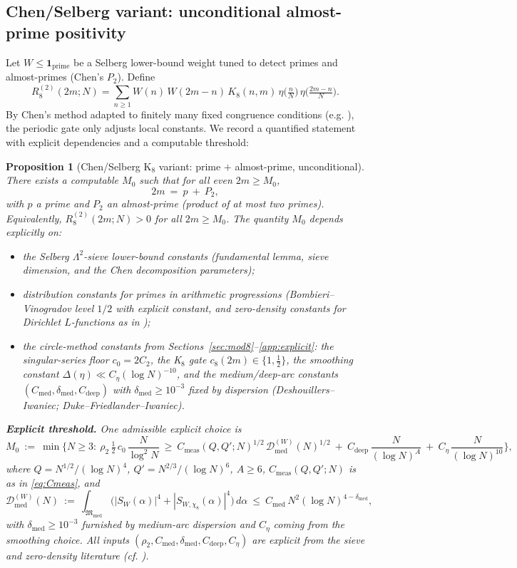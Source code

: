 \documentclass[11pt]{article}
\newtheorem{proposition}[theorem]{Proposition}
\theoremstyle{definition}
\theoremstyle{remark}
\begin{document}
\subsection*{Chen/Selberg variant: unconditional almost-prime positivity}
Let $W\le \mathbf 1_{\mathrm{prime}}$ be a Selberg lower-bound weight tuned to detect primes and almost-primes (Chen’s $P_2$). Define
\[
R_8^{(2)}(2m;N)=\sum_{n\ge 1} W(n)\,W(2m{-}n)\,K_8(n,m)\,\eta\!\Big(\tfrac{n}{N}\Big)\,\eta\!\Big(\tfrac{2m-n}{N}\Big).
\]
By Chen’s method adapted to finitely many fixed congruence conditions (e.g. \cite{Chen1973,Vaughan1997}), the periodic gate only adjusts local constants. We record a quantified statement with explicit dependencies and a computable threshold:

\begin{proposition}[Chen/Selberg K$_8$ variant: prime $+$ almost-prime, unconditional]
There exists a computable $M_0$ such that for all even $2m\ge M_0$,
\[
2m\ =\ p\ +\ P_2,
\]
with $p$ a prime and $P_2$ an almost-prime (product of at most two primes). Equivalently, $R_8^{(2)}(2m;N)>0$ for all $2m\ge M_0$. The quantity $M_0$ depends explicitly on:
\begin{itemize}
  \item the Selberg $\Lambda^2$-sieve lower-bound constants (fundamental lemma, sieve dimension, and the Chen decomposition parameters);
  \item distribution constants for primes in arithmetic progressions (Bombieri–Vinogradov level $1/2$ with explicit constant, and zero-density constants for Dirichlet $L$-functions as in \cite[Ch.~13]{MontgomeryVaughan2007});
  \item the circle-method constants from Sections~\ref{sec:mod8}–\ref{app:explicit}: the singular-series floor $c_0=2C_2$, the K$_8$ gate $c_8(2m)\in\{1,\tfrac12\}$, the smoothing constant $\Delta(\eta)\ll C_{\eta}(\log N)^{-10}$, and the medium/deep-arc constants $(C_{\mathrm{med}},\delta_{\mathrm{med}},C_{\mathrm{deep}})$ with $\delta_{\mathrm{med}}\ge 10^{-3}$ fixed by dispersion (Deshouillers–Iwaniec; Duke–Friedlander–Iwaniec).
\end{itemize}

\medskip
\noindent\textbf{Explicit threshold.} One admissible explicit choice is
\[
M_0\ :=\ \min\Big\{N\ge 3:\ \rho_2\,\tfrac12\,c_0\,\frac{N}{\log^2 N}\ \ge\ C_{\mathrm{meas}}(Q,Q';N)^{1/2}\,\mathcal D_{\mathrm{med}}^{(W)}(N)^{1/2}\ +\ C_{\mathrm{deep}}\,\frac{N}{(\log N)^A}\ +\ C_{\eta}\,\frac{N}{(\log N)^{10}}\Big\},
\]
where $Q=N^{1/2}/(\log N)^4$, $Q'=N^{2/3}/(\log N)^6$, $A\ge 6$, $C_{\mathrm{meas}}(Q,Q';N)$ is as in \eqref{eq:Cmeas}, and
\[
\mathcal D_{\mathrm{med}}^{(W)}(N)\ :=\ \int_{\mathfrak M_{\mathrm{med}}}\big(|S_W(\alpha)|^4+|S_{W,\chi_8}(\alpha)|^4\big)\,d\alpha\ \le\ C_{\mathrm{med}}\,N^2(\log N)^{4-\delta_{\mathrm{med}}},
\]
with $\delta_{\mathrm{med}}\ge 10^{-3}$ furnished by medium-arc dispersion and $C_{\eta}$ coming from the smoothing choice. All inputs $(\rho_2,C_{\mathrm{med}},\delta_{\mathrm{med}},C_{\mathrm{deep}},C_{\eta})$ are explicit from the sieve and zero-density literature (cf. \cite{Chen1973, Vaughan1997}).


\end{proposition}
\end{document}
